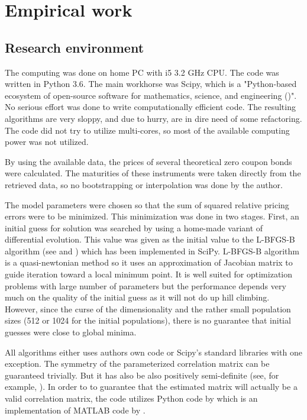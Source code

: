 \chapter{Empirical work}
\label{chap:empirical}

\section{Research environment}

The computing was done on home PC with i5 3.2 GHz CPU. The code was written in Python 3.6. The main workhorse was Scipy, which is a "Python-based ecosystem of open-source software for mathematics, science, and engineering (\cite{Scipy})". No serious effort was done to write computationally efficient code. The resulting algorithms are very sloppy, and due to hurry, are in dire need of some refactoring. The code did not try to utilize multi-cores, so most of the available computing power was not utilized.

By using the available data, the prices of several theoretical zero coupon bonds were calculated. The maturities of these instruments were taken directly from the retrieved data, so no bootstrapping or interpolation was done by the author. 

The model parameters were chosen so that the sum of squared relative pricing errors were to be minimized. This minimization was done in two stages. First, an initial guess for solution was searched by using a home-made variant of differential evolution. This value was given as the initial value to the L-BFGS-B algorithm (see \textcite{byrd1995limited} and \textcite{zhu1997algorithm}) which has been implemented in SciPy. L-BFGS-B algorithm is a quasi-newtonian method so it uses an approximation of Jacobian matrix to guide iteration toward a local minimum point. It is well suited for optimization problems with large number of parameters but the performance depends very much on the quality of the initial guess as it will not do up hill climbing. However, since the curse of the dimensionality and the rather small population sizes (512 or 1024 for the initial populations), there is no guarantee that initial guesses were close to global minima.

All algorithms either uses authors own code or Scipy's standard libraries with one exception. The symmetry of the parameterized correlation matrix can be guaranteed trivially. But it has also be also positively semi-definite (see, for example, \textcite{higham2002computing}). In order to to guarantee that the estimated matrix will actually be a valid correlation matrix, the code utilizes Python code by \textcite{crouchernearestcorrmatrix} which is an implementation of MATLAB code by \textcite{highamearestcorrmatrix}.

